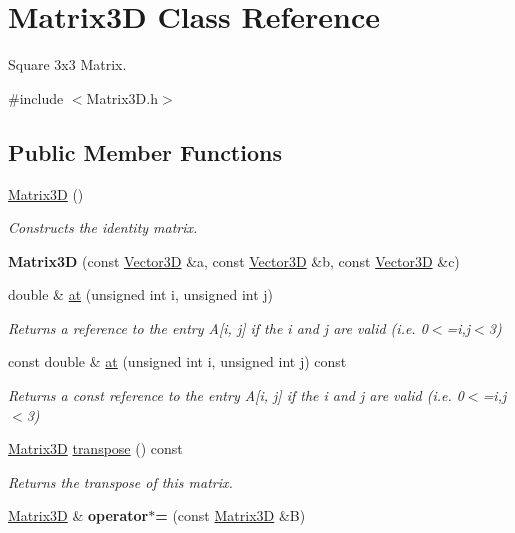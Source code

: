 \hypertarget{classMatrix3D}{}\section{Matrix3D Class Reference}
\label{classMatrix3D}


Square 3x3 Matrix.  




{\ttfamily \#include $<$Matrix3\+D.\+h$>$}

\subsection*{Public Member Functions}
\begin{DoxyCompactItemize}
\item 
\hyperlink{classMatrix3D_afe9c6b7abe858fe9f6aea8f0607a00a7}{Matrix3D} ()\hypertarget{classMatrix3D_afe9c6b7abe858fe9f6aea8f0607a00a7}{}\label{classMatrix3D_afe9c6b7abe858fe9f6aea8f0607a00a7}

\begin{DoxyCompactList}\small\item\em Constructs the identity matrix. \end{DoxyCompactList}\item 
{\bfseries Matrix3D} (const \hyperlink{classVector3D}{Vector3D} \&a, const \hyperlink{classVector3D}{Vector3D} \&b, const \hyperlink{classVector3D}{Vector3D} \&c)\hypertarget{classMatrix3D_a1e319e164a50a609d623b210a6526162}{}\label{classMatrix3D_a1e319e164a50a609d623b210a6526162}

\item 
double \& \hyperlink{classMatrix3D_aeda900804791fb0ea809a38c5579c43f}{at} (unsigned int i, unsigned int j)
\begin{DoxyCompactList}\small\item\em Returns a reference to the entry A\mbox{[}i, j\mbox{]} if the i and j are valid (i.\+e. 0$<$=i,j$<$3) \end{DoxyCompactList}\item 
const double \& \hyperlink{classMatrix3D_ae920d5255a9b19f17a8872d7a67c6ab9}{at} (unsigned int i, unsigned int j) const 
\begin{DoxyCompactList}\small\item\em Returns a const reference to the entry A\mbox{[}i, j\mbox{]} if the i and j are valid (i.\+e. 0$<$=i,j$<$3) \end{DoxyCompactList}\item 
\hyperlink{classMatrix3D}{Matrix3D} \hyperlink{classMatrix3D_a9f731ed614a6b7bf722f50e355829a40}{transpose} () const 
\begin{DoxyCompactList}\small\item\em Returns the transpose of this matrix. \end{DoxyCompactList}\item 
\hyperlink{classMatrix3D}{Matrix3D} \& {\bfseries operator$\ast$=} (const \hyperlink{classMatrix3D}{Matrix3D} \&B)\hypertarget{classMatrix3D_a804d764f3d7b0465964a4123bd638da7}{}\label{classMatrix3D_a804d764f3d7b0465964a4123bd638da7}


\end{DoxyCompactItemize}
